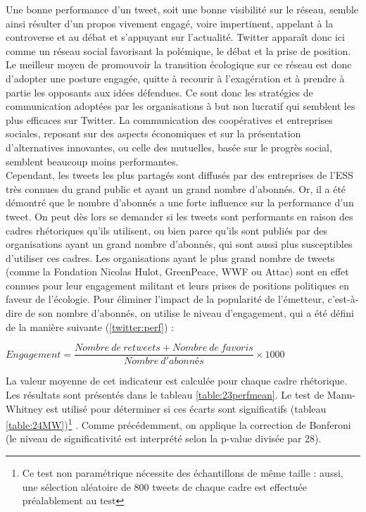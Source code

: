             Une bonne performance d’un tweet, soit une bonne visibilité sur le réseau, semble ainsi résulter d’un propos vivement engagé, voire impertinent, appelant à la controverse et au débat et s’appuyant sur l’actualité. Twitter apparaît donc ici comme un réseau social favorisant la polémique, le débat et la prise de position. Le meilleur moyen de promouvoir la transition écologique sur ce réseau est donc d’adopter une posture engagée, quitte à recourir à l’exagération et à prendre à partie les opposants aux idées défendues. Ce sont donc les stratégies de communication adoptées par les organisations à but non lucratif qui semblent les plus efficaces sur Twitter. La communication des coopératives et entreprises sociales, reposant sur des aspects économiques et sur la présentation d’alternatives innovantes, ou celle des mutuelles, basée sur le progrès social, semblent beaucoup moins performantes.  \\

            Cependant, les tweets les plus partagés sont diffusés par des entreprises de l’ESS très connues du grand public et ayant un grand nombre d’abonnés. Or, il a été démontré que le nombre d’abonnés a une forte influence sur la performance d'un tweet. On peut dès lors se demander si les tweets sont performants en raison des cadres rhétoriques qu’ils utilisent, ou bien parce qu’ils sont publiés par des organisations ayant un grand nombre d’abonnés, qui sont aussi plus susceptibles d’utiliser ces cadres. Les organisations ayant le plus grand nombre de tweets (comme la Fondation Nicolas Hulot, GreenPeace, WWF ou Attac) sont en effet connues pour leur engagement militant et leurs prises de positions politiques en faveur de l’écologie. Pour éliminer l’impact de la popularité de l’émetteur, c’est-à-dire de son nombre d’abonnés, on utilise le niveau d'engagement, qui a été défini de la manière suivante (\ref{twitter:perf}) : \\
            \begin{center}
                $Engagement = \dfrac{Nombre\ de\ retweets + Nombre\ de \ favoris}{Nombre\ d'abonnés} \times 1000$ \\
            \end{center}

            La valeur moyenne de cet indicateur est calculée pour chaque cadre rhétorique. Les résultats sont présentés dans le tableau \ref{table:23perfmean}. Le test de Mann-Whitney est utilisé pour déterminer si ces écarts sont significatifs (tableau \ref{table:24MW})\footnote{Ce test non paramétrique nécessite des échantillons de même taille : aussi, une sélection aléatoire de 800 tweets de chaque cadre est effectuée préalablement au test} . Comme précédemment, on applique la correction de Bonferoni (le niveau de significativité est interprété selon la p-value divisée par 28).

